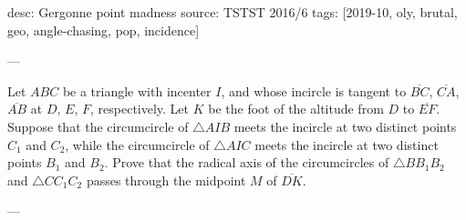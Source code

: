 desc: Gergonne point madness
source: TSTST 2016/6
tags: [2019-10, oly, brutal, geo, angle-chasing, pop, incidence]

---

Let $ABC$ be a triangle with incenter $I$, and whose incircle is tangent to $\overline{BC}$, $\overline{CA}$, $\overline{AB}$ at $D$, $E$, $F$, respectively. Let $K$ be the foot of the altitude from $D$ to $\overline{EF}$. Suppose that the circumcircle of $\triangle AIB$ meets the incircle at two distinct points $C_1$ and $C_2$, while the circumcircle of $\triangle AIC$ meets the incircle at two distinct points $B_1$ and $B_2$. Prove that the radical axis of the circumcircles of $\triangle BB_1B_2$ and $\triangle CC_1C_2$ passes through the midpoint $M$ of $\overline{DK}$.

---

